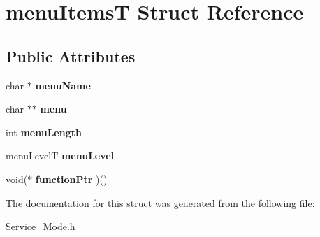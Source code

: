 \hypertarget{structmenu_items_t}{}\section{menu\+ItemsT Struct Reference}
\label{structmenu_items_t}
\subsection*{Public Attributes}
\begin{DoxyCompactItemize}
\item 
char $\ast$ {\bfseries menu\+Name}
\item 
char $\ast$$\ast$ {\bfseries menu}
\item 
int {\bfseries menu\+Length}
\item 
menu\+LevelT {\bfseries menu\+Level}
\item 
void($\ast$ {\bfseries function\+Ptr} )()
\end{DoxyCompactItemize}


The documentation for this struct was generated from the following file\+:\begin{DoxyCompactItemize}
\item 
Service\+\_\+\+Mode.\+h\end{DoxyCompactItemize}
